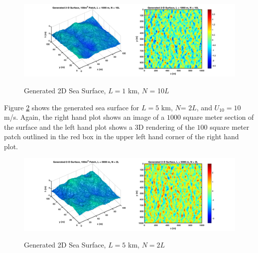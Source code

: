 \begin{figure}[ht]
  \begin{center}
\includegraphics[width=6in]{../media/Ocean_Surface/sea_surface_2d_surf_1000_10.png}
  \end{center}
  \renewcommand{\baselinestretch}{1} \small\normalsize
  \begin{quote}
    \caption[Generated 2D Sea Surface, $L = 1$ km, $N$ = 10$L$]{Generated 2D Sea Surface, $L = 1$ km, $N$ = 10$L$ \label{os_fig:8a}}
  \end{quote}
\end{figure}
\renewcommand{\baselinestretch}{2} \small\normalsize

Figure \ref{os_fig:11} shows the generated sea surface for $L = 5$ km, $N$= $2L$, and $U_{10} = 10$ m/s. Again, the right hand plot shows an image of a $1000$ square meter section of the surface and the left hand plot shows a 3D rendering of the $100$ square meter patch outlined in the red box in the upper left hand corner of the right hand plot.

\begin{figure}[ht]
  \begin{center}
\includegraphics[width=6in]{../media/Ocean_Surface/sea_surface_2d_surf_5000.png}
  \end{center}
  \renewcommand{\baselinestretch}{1} \small\normalsize
  \begin{quote}
    \caption[Generated 2D Sea Surface, $L = 5$ km, $N=2L$]{Generated 2D Sea Surface, $L = 5$ km, $N=2L$ \label{os_fig:11}}
  \end{quote}
\end{figure}
\renewcommand{\baselinestretch}{2} \small\normalsize

